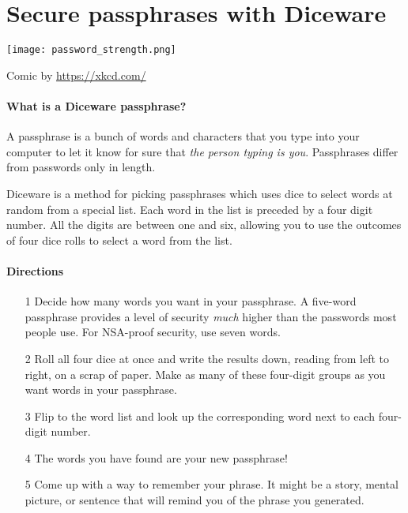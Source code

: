 \chapter*{Secure passphrases with Diceware}
\label{ch:diceware}

\vspace{-.2in}
\texttt{[image: password\_strength.png]}

\vspace{-.125in}
\begin{tiny}
	\begin{center}
		Comic by \url{https://xkcd.com/} \ccbync 
	\end{center}
\end{tiny}

\newpage
\setlength{\parindent}{0em}
\setlength{\parskip}{0.25em}

\subsubsection*{What is a Diceware passphrase?}

A passphrase is a bunch of words and characters that you type into your computer to let it know for sure that \textit{the person typing is you}. Passphrases differ from passwords only in length.

Diceware is a method for picking passphrases which uses dice to select words at random from a special list. Each word in the list is preceded by a four digit number. All the digits are between one and six, allowing you to use the outcomes of four dice rolls to select a word from the list.

\subsubsection*{Directions}

\begin{itemize}[leftmargin=*]

\item[1] Decide how many words you want in your passphrase. A five-word passphrase provides a level of security \textit{much} higher than the passwords most people use. For NSA-proof security, use seven words.

\item[2] Roll all four dice at once and write the results down, reading from left to right, on a scrap of paper. Make as many of these four-digit groups as you want words in your passphrase.

\item[3] Flip to the word list and look up the corresponding word next to each four-digit number.

\item[4] The words you have found are your new passphrase!

\item[5] Come up with a way to remember your phrase. It might be a story, mental picture, or sentence that will remind you of the phrase you generated.

\end{itemize}


